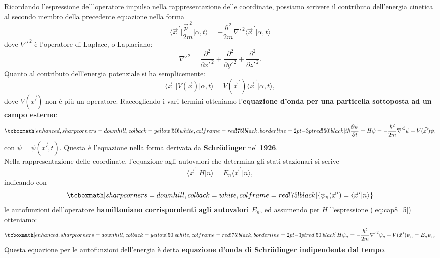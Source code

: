 \documentclass[a4paper,12pt,oneside]{book}
\begin{document}
Ricordando l'espressione dell'operatore impulso nella rappresentazione delle coordinate, possiamo scrivere il contributo dell'energia cinetica al secondo membro della precedente equazione nella forma
	\begin{equation}
		\langle {\vec{x}}^{\, \prime}\vert \frac{\vec{p}^{\ 2}}{2m} \vert \alpha , t \rangle = -\frac{\hbar^2}{2m}{{\nabla}'}^{\, 2}\langle {\vec{x}}^{\, \prime}\vert \alpha , t \rangle
\end{equation}
dove ${{\nabla}'}^{\, 2}$ è l'operatore di Laplace, o Laplaciano:
\begin{equation}
{{\nabla}'}^{\, 2}= \frac{\partial ^2}{\partial {x'} ^{\, 2}}+\frac{\partial ^2}{\partial {y'} ^{\, 2}}+\frac{\partial ^2}{\partial {z'} ^{\, 2}}.
\end{equation}
Quanto al contributo dell'energia potenziale si ha semplicemente:
	\begin{equation}
		\langle {\vec{x}}^{\, \prime}\vert V(\vec{x}) \vert \alpha , t \rangle = V({\vec{x}}^{\, \prime})\langle {\vec{x}}^{\, \prime}  \vert \alpha , t \rangle ,
	\end{equation}
dove $V(\vec{x'})$ non è più un operatore. Raccogliendo i vari termini otteniamo l'\textbf{equazione d'onda per una particella sottoposta ad un campo esterno}:
	\begin{equation}
		\tcboxmath[enhanced, sharp corners=downhill, colback=yellow!50!white, colframe=red!75!black, borderline={2pt}{-3pt}{red!50!black}]{
			i\hbar \frac{\partial \psi}{\partial t} = H\psi = -\frac{\hbar ^2}{2m}{\nabla '} ^2 \psi + V(\vec{x'}) \psi,
			}
\end{equation}
con $\psi =\psi(\vec{x'}, t)$. Questa è l'equazione nella forma derivata da \textbf{Schr\"{o}dinger} nel \textbf{1926}.\\

Nella rappresentazione delle coordinate, l'equazione agli autovalori che determina gli stati stazionari si scrive
	\begin{equation}
		\langle {\vec{x}}^{\, \prime} \vert H \vert n \rangle = E_n\langle {\vec{x}}^{\, \prime} \vert n \rangle,
	\end{equation}
indicando con
	\begin{equation}
		\tcboxmath[sharp corners=downhill, colback=white, colframe=red!75!black]{
			\psi _n ({\vec{x}}^{\, \prime}) = \langle {\vec{x}}^{\, \prime} \vert n \rangle
			}
	\end{equation}
le autofunzioni dell'operatore \textbf{hamiltoniano corrispondenti agli autovalori $E_n$}, ed assumendo per $H$ l'espressione (\ref{eq:cap8_5}) otteniamo:
	\begin{equation}
		\tcboxmath[enhanced, sharp corners=downhill, colback=yellow!50!white, colframe=red!75!black, borderline={2pt}{-3pt}{red!50!black}]{
			H\psi _n = -\frac{\hbar ^ 2}{2m}{{\nabla '}^{\, 2}} \psi _n + V({\vec{x}}^{\, \prime})\psi _n = E_n \psi _n.
			}
	\end{equation}
Questa equazione per le autofunzioni dell'energia è detta \textbf{equazione d'onda di Schr\"{o}dinger indipendente dal tempo}.\\
\end{document}

